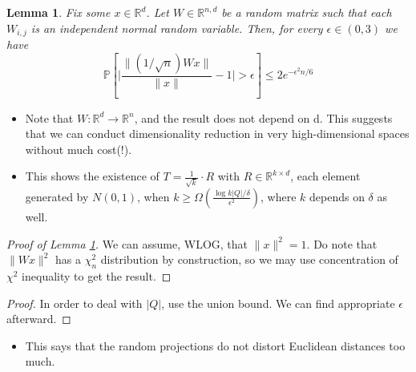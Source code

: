 \documentclass[11pt,reqno]{amsart}
\newtheorem{lemma}[theorem]{Lemma}
\theoremstyle{remark}
\begin{document}
\begin{lemma}\label{lem:concentration}
Fix some $x\in\mathbb{R}^d$. Let $W\in\mathbb{R}^{n,d}$ be a random matrix such that each $W_{i,j}$
 is an independent normal random variable. Then, for every $\epsilon\in (0,3)$ we have
 \begin{equation}
 \mathbb{P}[\lvert \frac{\lVert (1/\sqrt n)Wx\rVert}{\lVert 
    x\rVert}-1 \rvert>\epsilon]\leq 2e^{-\epsilon^2 n/6}
 \end{equation}
\end{lemma}
\begin{itemize}
\item Note that $W:\mathbb{R}^d\to\mathbb{R}^n$, and the result does not depend on d. This suggests
 that we can conduct dimensionality reduction in very high-dimensional spaces without much cost(!).
\item This shows the existence of $T=\frac{1}{\sqrt k}\cdot R$ with
 $R\in \mathbb{R}^{k\times d}$, each element generated by $N(0,1)$, when 
 $k\geq \Omega(\frac {\log{k\lvert Q\rvert}/\delta}{\epsilon^2})$, where $k$ depends on $\delta$ as well. 
\end{itemize}
\begin{proof}[Proof of Lemma \ref{lem:concentration}]
We can assume, WLOG, that $\lVert x\rVert^2=1$. Do note that $\lVert Wx\rVert^2$ has a $\chi_n^2$ distribution
 by construction, so we may use concentration of $\chi^2$ inequality to get the result.
\end{proof}
\begin{proof}
In order to deal with $\lvert Q\rvert$, use the union bound. We can find appropriate $\epsilon$ afterward.
\end{proof}
\begin{itemize}
\item This says that the random projections do not distort Euclidean distances too much.
\end{itemize}
\end{document}
